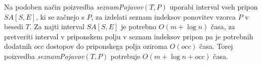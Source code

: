 Na podoben način poizvedba \textit{seznamPojavov}$(T,P)$ uporabi interval vseh pripon $SA[S,E]$, ki se začnejo s $P$, za izdelati seznam indeksov ponovitev vzorca $P$ v besedi $T$. Za najti interval $SA[S,E]$ je potrebno $O(m+\log{n})$ časa, za pretveriti interval v priponskem polju v seznam indeksov pripon pa je potrebnih dodatnih $occ$ dostopov do priponskega polja oziroma $O(occ)$ časa. Torej poizvedba \textit{seznamPojavov}$(T,P)$ potrebuje $O(m+\log{n}+occ)$ časa.


